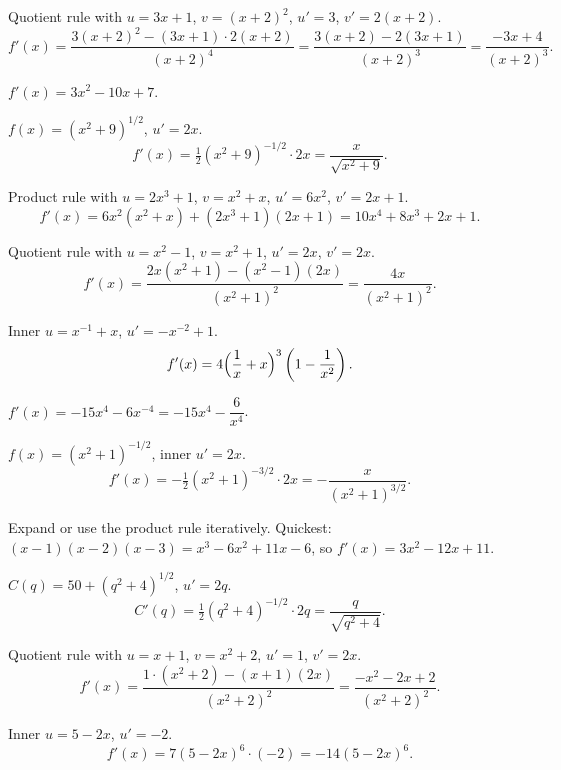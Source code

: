 \begin{solutions}
  \item Quotient rule with $u=3x+1$, $v=(x+2)^{2}$, $u'=3$,
        $v'=2(x+2)$.
        \[
          f'(x)=\frac{3(x+2)^{2}-(3x+1)\cdot 2(x+2)}{(x+2)^{4}}
               =\frac{3(x+2)-2(3x+1)}{(x+2)^{3}}=\frac{-3x+4}{(x+2)^{3}} .
        \]

  \item $f'(x)=3x^{2}-10x+7$.

  \item $f(x)=(x^{2}+9)^{1/2}$, $u'=2x$.
        \[
          f'(x)=\tfrac12(x^{2}+9)^{-1/2}\cdot 2x=\frac{x}{\sqrt{x^{2}+9}} .
        \]

  \item Product rule with $u=2x^{3}+1$, $v=x^{2}+x$, $u'=6x^{2}$,
        $v'=2x+1$.
        \[
          f'(x)=6x^{2}(x^{2}+x)+(2x^{3}+1)(2x+1)=10x^{4}+8x^{3}+2x+1 .
        \]

  \item Quotient rule with $u=x^{2}-1$, $v=x^{2}+1$, $u'=2x$, $v'=2x$.
        \[
          f'(x)=\frac{2x(x^{2}+1)-(x^{2}-1)(2x)}{(x^{2}+1)^{2}}
               =\frac{4x}{(x^{2}+1)^{2}} .
        \]

  \item Inner $u=x^{-1}+x$, $u'=-x^{-2}+1$.
        \[
          f'(x)=4\Bigl(\frac{1}{x}+x\Bigr)^{3}\left(1-\frac{1}{x^{2}}\right) .
        \]

  \item $f'(x)=-15x^{4}-6x^{-4}=-15x^{4}-\dfrac{6}{x^{4}}$.

  \item $f(x)=(x^{2}+1)^{-1/2}$, inner $u'=2x$.
        \[
          f'(x)=-\tfrac12(x^{2}+1)^{-3/2}\cdot 2x=-\frac{x}{(x^{2}+1)^{3/2}} .
        \]

  \item Expand or use the product rule iteratively. Quickest:
        $(x-1)(x-2)(x-3)=x^{3}-6x^{2}+11x-6$, so $f'(x)=3x^{2}-12x+11$.

  \item $C(q)=50+(q^{2}+4)^{1/2}$, $u'=2q$.
        \[
          C'(q)=\tfrac12(q^{2}+4)^{-1/2}\cdot 2q=\frac{q}{\sqrt{q^{2}+4}} .
        \]

  \item Quotient rule with $u=x+1$, $v=x^{2}+2$, $u'=1$, $v'=2x$.
        \[
          f'(x)=\frac{1\cdot(x^{2}+2)-(x+1)(2x)}{(x^{2}+2)^{2}}
               =\frac{-x^{2}-2x+2}{(x^{2}+2)^{2}} .
        \]

  \item Inner $u=5-2x$, $u'=-2$.
        \[
          f'(x)=7(5-2x)^{6}\cdot(-2)=-14(5-2x)^{6} .
        \]


\end{solutions}
